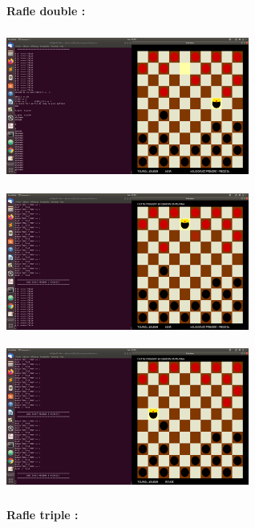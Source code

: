 \documentclass[a4paper]{article}
\begin{document}
\bigbreak
\large\bf{Rafle double : }
\bigbreak



\includegraphics[width = 8cm, height = 5cm]{rafle2-1.png}
\includegraphics[width = 8cm, height = 5cm]{rafle2-2.png}
\bigbreak
\includegraphics[width = 8cm, height = 5cm]{rafle2-3.png}



\bigbreak
\large\bf{Rafle triple : }
\bigbreak
\end{document}
